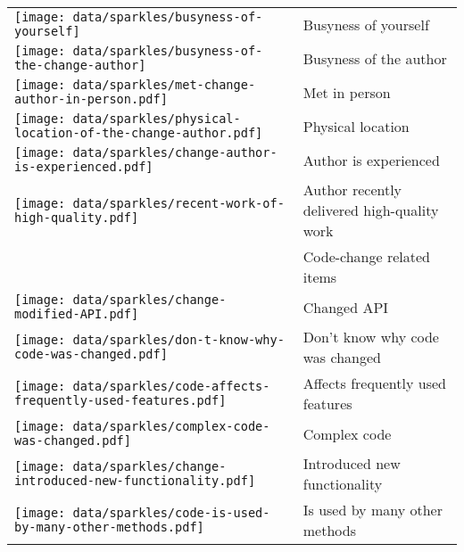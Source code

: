 \begin{table}[t!]
\begin{tabular}{ll}
\vspace{-2pt}\texttt{[image: data/sparkles/busyness-of-yourself]} & Busyness of yourself\\
\vspace{-2pt}\texttt{[image: data/sparkles/busyness-of-the-change-author]} & Busyness of the author\\
\vspace{-2pt}\texttt{[image: data/sparkles/met-change-author-in-person.pdf]} & Met in person\\
\vspace{-2pt}\texttt{[image: data/sparkles/physical-location-of-the-change-author.pdf]} & Physical location\\
\vspace{-2pt}\texttt{[image: data/sparkles/change-author-is-experienced.pdf]} & Author is experienced\\
\vspace{-2pt}\texttt{[image: data/sparkles/recent-work-of-high-quality.pdf]} & Author recently delivered high-quality work\\
\midrule
\vspace{-2pt}& Code-change related items \\
\midrule
\vspace{-2pt}\texttt{[image: data/sparkles/change-modified-API.pdf]} & Changed API\\
\vspace{-2pt}\texttt{[image: data/sparkles/don-t-know-why-code-was-changed.pdf]} & Don't know why code was changed\\
\vspace{-2pt}\texttt{[image: data/sparkles/code-affects-frequently-used-features.pdf]} & Affects frequently used features\\
\vspace{-2pt}\texttt{[image: data/sparkles/complex-code-was-changed.pdf]} & Complex code\\
\vspace{-2pt}\texttt{[image: data/sparkles/change-introduced-new-functionality.pdf]} & Introduced new functionality\\
\vspace{-2pt}\texttt{[image: data/sparkles/code-is-used-by-many-other-methods.pdf]} & Is used by many other methods\\

\end{tabular}
\end{table}
